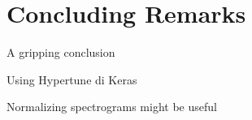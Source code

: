 
\section{Concluding Remarks}
\label{sec:conclusions}

A gripping conclusion

Using Hypertune di Keras

Normalizing spectrograms might be useful
